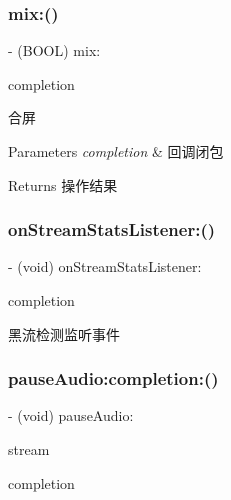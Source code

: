 \subsubsection{\texorpdfstring{mix\+:()}{mix:()}}
{\footnotesize\ttfamily -\/ (B\+O\+OL) mix\+: \begin{DoxyParamCaption}\item[{(C\+C\+Comletion\+Block)}]{completion }\end{DoxyParamCaption}}

合屏 
\begin{DoxyParams}{Parameters}
{\em completion} & 回调闭包 \\
\hline
\end{DoxyParams}
\begin{DoxyReturn}{Returns}
操作结果 
\end{DoxyReturn}
\mbox{\label{interface_c_c_streamer_basic_a3df60b5ba3cc43eb471ec439e571be95}} 
\subsubsection{\texorpdfstring{on\+Stream\+Stats\+Listener\+:()}{onStreamStatsListener:()}}
{\footnotesize\ttfamily -\/ (void) on\+Stream\+Stats\+Listener\+: \begin{DoxyParamCaption}\item[{(C\+C\+Comletion\+Block)}]{completion }\end{DoxyParamCaption}}

黑流检测监听事件 \mbox{\label{interface_c_c_streamer_basic_a78af8bc6810731775ba13a3272c6f93e}} 
\subsubsection{\texorpdfstring{pause\+Audio\+:completion\+:()}{pauseAudio:completion:()}}
{\footnotesize\ttfamily -\/ (void) pause\+Audio\+: \begin{DoxyParamCaption}\item[{(\hyperlink{interface_c_c_stream}{C\+C\+Stream} $\ast$)}]{stream }\item[{completion:(C\+C\+Comletion\+Block)}]{completion }\end{DoxyParamCaption}}

